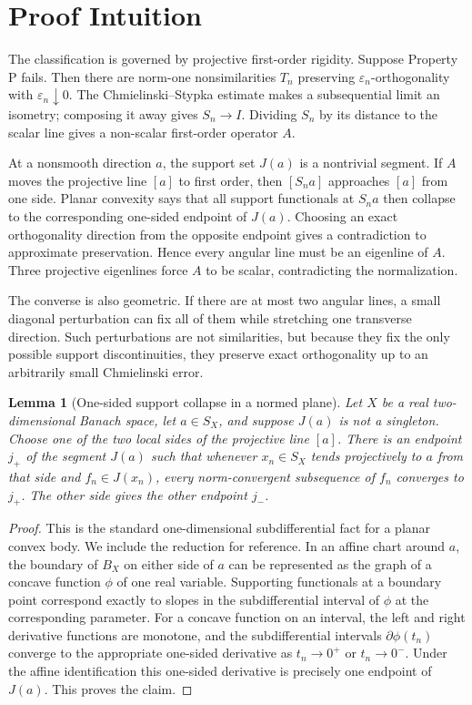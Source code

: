 \documentclass[11pt]{article}
\newtheorem{lemma}{Lemma}
\newcommand{\eps}{\varepsilon}
\begin{document}
\section*{Proof Intuition}

The classification is governed by projective first-order rigidity.  Suppose
Property P fails.  Then there are norm-one nonsimilarities \(T_n\) preserving
\(\eps_n\)-orthogonality with \(\eps_n\downarrow0\).  The
Chmielinski--Stypka estimate makes a subsequential limit an isometry; composing
it away gives \(S_n\to I\).  Dividing \(S_n\) by its distance to the scalar
line gives a non-scalar first-order operator \(A\).

At a nonsmooth direction \(a\), the support set \(J(a)\) is a nontrivial
segment.  If \(A\) moves the projective line \([a]\) to first order, then
\([S_n a]\) approaches \([a]\) from one side.  Planar convexity says that all
support functionals at \(S_n a\) then collapse to the corresponding one-sided
endpoint of \(J(a)\).  Choosing an exact orthogonality direction from the
opposite endpoint gives a contradiction to approximate preservation.  Hence
every angular line must be an eigenline of \(A\).  Three projective eigenlines
force \(A\) to be scalar, contradicting the normalization.

The converse is also geometric.  If there are at most two angular lines, a
small diagonal perturbation can fix all of them while stretching one transverse
direction.  Such perturbations are not similarities, but because they fix the
only possible support discontinuities, they preserve exact orthogonality up to
an arbitrarily small Chmielinski error.

\begin{lemma}[One-sided support collapse in a normed plane]
\label{lem:one-sided}
Let \(X\) be a real two-dimensional Banach space, let \(a\in S_X\), and suppose
\(J(a)\) is not a singleton.  Choose one of the two local sides of the
projective line \([a]\).  There is an endpoint \(j_+\) of the segment \(J(a)\)
such that whenever \(x_n\in S_X\) tends projectively to \(a\) from that side
and \(f_n\in J(x_n)\), every norm-convergent subsequence of \(f_n\) converges
to \(j_+\).  The other side gives the other endpoint \(j_-\).
\end{lemma}

\begin{proof}
This is the standard one-dimensional subdifferential fact for a planar convex
body.  We include the reduction for reference.  In an affine chart around
\(a\), the boundary of \(B_X\) on either side of \(a\) can be represented as
the graph of a concave function \(\phi\) of one real variable.  Supporting
functionals at a boundary point correspond exactly to slopes in the
subdifferential interval of \(\phi\) at the corresponding parameter.  For a
concave function on an interval, the left and right derivative functions are
monotone, and the subdifferential intervals \(\partial\phi(t_n)\) converge to
the appropriate one-sided derivative as \(t_n\to0^+\) or \(t_n\to0^-\).  Under
the affine identification this one-sided derivative is precisely one endpoint
of \(J(a)\).  This proves the claim.
\end{proof}
\end{document}
